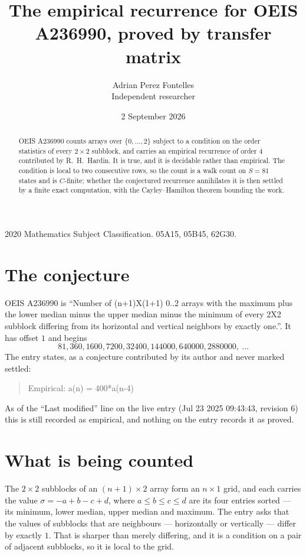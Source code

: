 \documentclass[11pt,a4paper]{article}
\title{The empirical recurrence for OEIS A236990, proved by transfer matrix}
\author{Adrian Perez Fontelles\\ \small Independent researcher}
\date{2 September 2026}
\theoremstyle{plain}
\theoremstyle{definition}
\begin{document}
\maketitle

\begin{abstract}
OEIS A236990 counts arrays over $\{0,\dots,2\}$ subject to a condition on the order
statistics of every $2\times2$ subblock, and carries an empirical recurrence of order
$4$ contributed by R.~H.~Hardin. It is true, and it is decidable rather than empirical.
The condition is local to two consecutive rows, so the count is a walk count on $S=81$
states and is $C$-finite; whether the conjectured recurrence annihilates it is then settled by
a finite exact computation, with the Cayley--Hamilton theorem bounding the work.
\end{abstract}

\noindent\small 2020 Mathematics Subject Classification. 05A15, 05B45, 62G30.\normalsize

\section{The conjecture}

OEIS A236990 is ``Number of (n+1)X(1+1) 0..2 arrays with the maximum plus the lower median minus the upper median minus the minimum of every 2X2 subblock differing from its horizontal and vertical neighbors by exactly one.''. It has offset $1$ and begins
\[
81, 360, 1600, 7200, 32400, 144000, 640000, 2880000,\ \dots
\]
The entry states, as a conjecture contributed by its author and never marked settled:
\begin{quote}
Empirical: a(n) = 400*a(n-4)
\end{quote}
As of the ``Last modified'' line on the live entry (Jul 23 2025 09:43:43, revision 6) this is still
recorded as empirical, and nothing on the entry records it as proved.

\section{What is being counted}

The $2\times2$ subblocks of an $(n+1)\times2$ array form an
$n\times1$ grid, and each carries the value $\sigma=-a+b-c+d$, where $a\le b\le c\le d$ are its four entries sorted --- its minimum, lower median, upper median and maximum. The entry asks that the values of
subblocks that are neighbours --- horizontally or vertically --- differ by exactly $1$.
That is sharper than merely differing, and it is a condition on a pair of adjacent subblocks,
so it is local to the grid.
\end{document}
